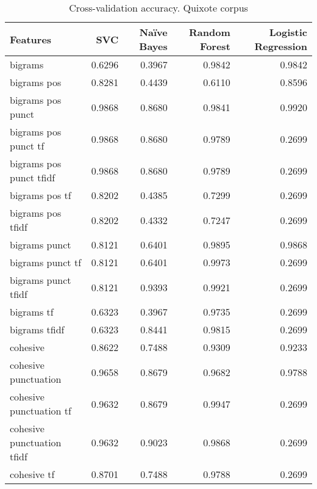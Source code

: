 \documentclass{article}
\begin{document}
\begin{table}
\centering
\caption{Cross-validation accuracy. Quixote corpus}
\begin{tabular}{lrrrr}
\toprule
{Features} &    SVC &  Naïve Bayes &  Random Forest &  Logistic Regression \\
\midrule
bigrams                    & 0.6296 &       0.3967 &         0.9842 &               0.9842 \\
bigrams pos                & 0.8281 &       0.4439 &         0.6110 &               0.8596 \\
bigrams pos punct          & 0.9868 &       0.8680 &         0.9841 &               0.9920 \\
bigrams pos punct tf       & 0.9868 &       0.8680 &         0.9789 &               0.2699 \\
bigrams pos punct tfidf    & 0.9868 &       0.8680 &         0.9789 &               0.2699 \\
bigrams pos tf             & 0.8202 &       0.4385 &         0.7299 &               0.2699 \\
bigrams pos tfidf          & 0.8202 &       0.4332 &         0.7247 &               0.2699 \\
bigrams punct              & 0.8121 &       0.6401 &         0.9895 &               0.9868 \\
bigrams punct tf           & 0.8121 &       0.6401 &         0.9973 &               0.2699 \\
bigrams punct tfidf        & 0.8121 &       0.9393 &         0.9921 &               0.2699 \\
bigrams tf                 & 0.6323 &       0.3967 &         0.9735 &               0.2699 \\
bigrams tfidf              & 0.6323 &       0.8441 &         0.9815 &               0.2699 \\
cohesive                   & 0.8622 &       0.7488 &         0.9309 &               0.9233 \\
cohesive punctuation       & 0.9658 &       0.8679 &         0.9682 &               0.9788 \\
cohesive punctuation tf    & 0.9632 &       0.8679 &         0.9947 &               0.2699 \\
cohesive punctuation tfidf & 0.9632 &       0.9023 &         0.9868 &               0.2699 \\
cohesive tf                & 0.8701 &       0.7488 &         0.9788 &               0.2699 \\

\end{tabular}
\end{table}
\end{document}
